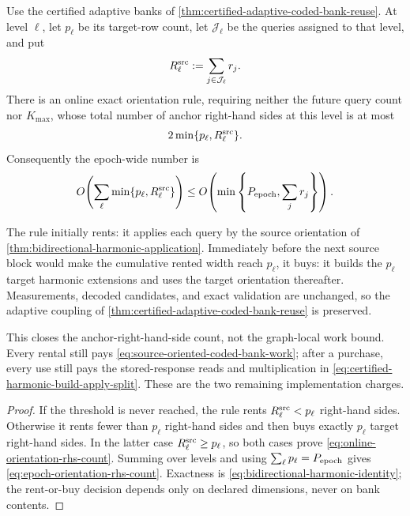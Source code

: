 \begin{corollary}
\label{cor:online-harmonic-rent-or-buy}
Use the certified adaptive banks of
\cref{thm:certified-adaptive-coded-bank-reuse}.  At level $\ell$, let
$p_\ell$ be its target-row count, let $\mathcal J_\ell$ be the queries
assigned to that level, and put
\begin{equation*}
 R_\ell^{\rm src}:=\sum_{j\in\mathcal J_\ell}r_j.
\end{equation*}
There is an online exact orientation rule, requiring neither the future query
count nor $K_{\max}$, whose total number of anchor right-hand sides at this
level is at most
\begin{equation}
 2\min\{p_\ell,R_\ell^{\rm src}\}.
 \label{eq:online-orientation-rhs-count}
\end{equation}
Consequently the epoch-wide number is
\begin{equation}
 O\!\left(
   \sum_\ell\min\{p_\ell,R_\ell^{\rm src}\}
 \right)
 \leq
 O\!\left(\min\left\{
   P_{\rm epoch},\sum_jr_j
 \right\}\right).
 \label{eq:epoch-orientation-rhs-count}
\end{equation}

The rule initially rents: it applies each query by the source orientation of
\cref{thm:bidirectional-harmonic-application}.  Immediately before the next
source block would make the cumulative rented width reach $p_\ell$, it buys:
it builds the $p_\ell$ target harmonic extensions and uses the target
orientation thereafter.  Measurements, decoded candidates, and exact
validation are unchanged, so the adaptive coupling of
\cref{thm:certified-adaptive-coded-bank-reuse} is preserved.

This closes the anchor-right-hand-side count, not the graph-local work bound.
Every rental still pays
\cref{eq:source-oriented-coded-bank-work}; after a purchase, every use still
pays the stored-response reads and multiplication in
\cref{eq:certified-harmonic-build-apply-split}.  These are the two remaining
implementation charges.
\end{corollary}

\begin{proof}
If the threshold is never reached, the rule rents
$R_\ell^{\rm src}<p_\ell$ right-hand sides.  Otherwise it rents fewer than
$p_\ell$ right-hand sides and then buys exactly $p_\ell$ target right-hand
sides.  In the latter case
$R_\ell^{\rm src}\geq p_\ell$, so both cases prove
\cref{eq:online-orientation-rhs-count}.  Summing over levels and using
$\sum_\ell p_\ell=P_{\rm epoch}$ gives
\cref{eq:epoch-orientation-rhs-count}.  Exactness is
\cref{eq:bidirectional-harmonic-identity}; the rent-or-buy decision depends
only on declared dimensions, never on bank contents.
\end{proof}

